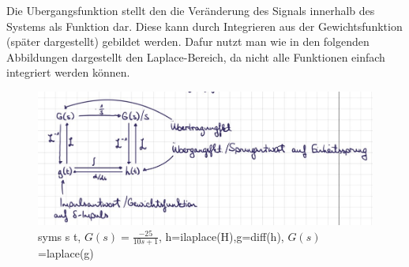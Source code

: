 Die Ubergangsfunktion stellt den die Veränderung des Signals innerhalb des Systems als Funktion dar. Diese
kann durch Integrieren aus der Gewichtsfunktion (später dargestellt) gebildet werden. Dafur nutzt man wie
in den folgenden Abbildungen dargestellt den Laplace-Bereich, da nicht alle Funktionen einfach integriert
werden können.
\begin{figure}[h]
    \begin{center}
        \includegraphics[width=13cm]{image/Screenshot 2022-12-13 161708.jpg}
    \end{center}
    \caption{syms s t, $G(s)=\frac{-25}{10s+1}$, h=ilaplace(H),g=diff(h), $G(s)$=laplace(g)}
\end{figure}
\\
